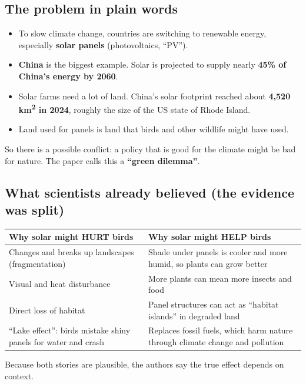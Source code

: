 \documentclass[11pt]{article}
\begin{document}
\subsection{The problem in plain words}
\begin{itemize}
\item To slow climate change, countries are switching to renewable energy, especially \textbf{solar panels} (photovoltaics, ``PV'').
\item \textbf{China} is the biggest example. Solar is projected to supply nearly \textbf{45\% of China's energy by 2060}.
\item Solar farms need a lot of land. China's solar footprint reached about \textbf{4,520 km\textsuperscript{2} in 2024}, roughly the size of the US state of Rhode Island.
\item Land used for panels is land that birds and other wildlife might have used.
\end{itemize}
So there is a possible conflict: a policy that is good for the climate might be bad for nature. The paper calls this a \textbf{``green dilemma''}.

\subsection{What scientists already believed (the evidence was split)}
\begin{table}[H]\centering\small
\begin{tabularx}{\linewidth}{>{\raggedright\arraybackslash}X>{\raggedright\arraybackslash}X}
\toprule
\textbf{Why solar might HURT birds} & \textbf{Why solar might HELP birds}\\
\midrule
Changes and breaks up landscapes (fragmentation) & Shade under panels is cooler and more humid, so plants can grow better\\
Visual and heat disturbance & More plants can mean more insects and food\\
Direct loss of habitat & Panel structures can act as ``habitat islands'' in degraded land\\
``Lake effect'': birds mistake shiny panels for water and crash & Replaces fossil fuels, which harm nature through climate change and pollution\\
\bottomrule
\end{tabularx}
\end{table}
Because both stories are plausible, the authors say the true effect depends on context.
\end{document}
